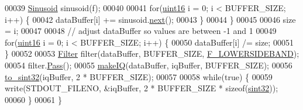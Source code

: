 \begin{DoxyCode}
00039         \hyperlink{classradio_1_1Sinusoid}{Sinusoid} sinusoid(f);
00040 
00041         \textcolor{keywordflow}{for}(\hyperlink{definitions_8hpp_a05f6b0ae8f6a6e135b0e290c25fe0e4e}{uint16} i = 0; i < BUFFER\_SIZE; i++) \{
00042             dataBuffer[i] += sinusoid.\hyperlink{classradio_1_1Sinusoid_aab44298ea1bd5cb175d5826243cf56f2}{next}();
00043         \}
00044     \}
00045 
00046     size = i;
00047     
00048     \textcolor{comment}{// adjust dataBuffer so values are between -1 and 1}
00049     \textcolor{keywordflow}{for}(\hyperlink{definitions_8hpp_a05f6b0ae8f6a6e135b0e290c25fe0e4e}{uint16} i = 0; i < BUFFER\_SIZE; i++) \{
00050         dataBuffer[i] /= size;
00051     \}
00052     
00053     \hyperlink{classradio_1_1Filter}{Filter} filter(dataBuffer, BUFFER\_SIZE, \hyperlink{namespaceradio_a0ffd57d5a11ff70a1f55dbdc8ebe098d}{F\_LOWERSIDEBAND});
00054     filter.\hyperlink{classradio_1_1Filter_ad2793821801780809af385463bf8f197}{Pass}();
00055     \hyperlink{namespaceradio_a7166522e76ff88e8d482491b1b6e2275}{makeIQ}(dataBuffer, iqBuffer, BUFFER\_SIZE);
00056     \hyperlink{namespaceradio_ae4b2334c4366dcdf0311ad79d2067945}{to\_sint32}(iqBuffer, 2 * BUFFER\_SIZE);
00057 
00058     \textcolor{keywordflow}{while}(\textcolor{keyword}{true}) \{
00059         write(STDOUT\_FILENO, &iqBuffer, 2 * BUFFER\_SIZE * \textcolor{keyword}{sizeof}(\hyperlink{definitions_8hpp_a0573de65958b4fda3a0460ed417dafb8}{sint32}));
00060     \}
00061 \}
\end{DoxyCode}
